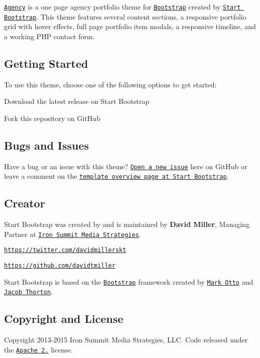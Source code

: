 \href{http://startbootstrap.com/template-overviews/agency/}{\tt Agency} is a one page agency portfolio theme for \href{http://getbootstrap.com/}{\tt Bootstrap} created by \href{http://startbootstrap.com/}{\tt Start Bootstrap}. This theme features several content sections, a responsive portfolio grid with hover effects, full page portfolio item modals, a responsive timeline, and a working P\+H\+P contact form.

\subsection*{Getting Started}

To use this theme, choose one of the following options to get started\+:
\begin{DoxyItemize}
\item Download the latest release on Start Bootstrap
\item Fork this repository on Git\+Hub
\end{DoxyItemize}

\subsection*{Bugs and Issues}

Have a bug or an issue with this theme? \href{https://github.com/IronSummitMedia/startbootstrap-agency/issues}{\tt Open a new issue} here on Git\+Hub or leave a comment on the \href{http://startbootstrap.com/template-overviews/agency/}{\tt template overview page at Start Bootstrap}.

\subsection*{Creator}

Start Bootstrap was created by and is maintained by {\bfseries David Miller}, Managing Partner at \href{http://www.ironsummitmedia.com/}{\tt Iron Summit Media Strategies}.


\begin{DoxyItemize}
\item \href{https://twitter.com/davidmillerskt}{\tt https\+://twitter.\+com/davidmillerskt}
\item \href{https://github.com/davidtmiller}{\tt https\+://github.\+com/davidtmiller}
\end{DoxyItemize}

Start Bootstrap is based on the \href{http://getbootstrap.com/}{\tt Bootstrap} framework created by \href{https://twitter.com/mdo}{\tt Mark Otto} and \href{https://twitter.com/fat}{\tt Jacob Thorton}.

\subsection*{Copyright and License}

Copyright 2013-\/2015 Iron Summit Media Strategies, L\+L\+C. Code released under the \href{https://github.com/IronSummitMedia/startbootstrap-agency/blob/gh-pages/LICENSE}{\tt Apache 2.} license. 